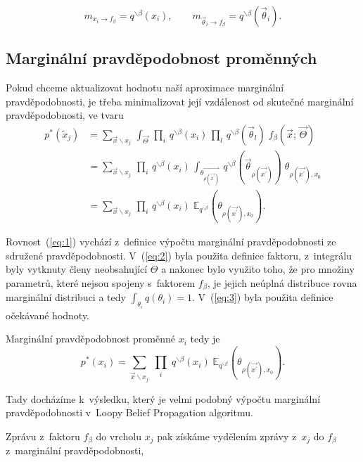 $$m_{x_i \rightarrow f_\beta} = q^{\backslash \beta}(x_i), 
\quad \quad
m_{\vec\theta_i \rightarrow f_\beta} = q^{\backslash \beta}(\vec\theta_i).$$

\subsection{Marginální pravděpodobnost proměnných}

Pokud chceme aktualizovat hodnotu naší aproximace marginální pravděpodobnosti,
je třeba minimalizovat její vzdálenost od skutečné marginální
pravděpodobnosti, ve tvaru
\begin{align}
p^*(\tilde{x}_j) &=
\sum_{\vec{x} \backslash x_j} \,
	\int_{\vec{\Theta}} \,
    		\prod_i \,
			q^{\backslash \beta}(x_i) \,
		\prod_l \,
			q^{\backslash \beta}(\vec{\theta}_l) \;
		f_\beta(\vec{x};\,
    		  \vec{\Theta})
\label{eq:1} 
\\
&=
\sum_{\vec{x} \backslash x_j} \,
	\prod_i \,
		q^{\backslash \beta}(x_i) \,
    \int_{\vec{\theta_{\rho(\vec{x^\prime})}}} \,
	    q^{\backslash \beta}(\vec{\theta}_{\rho(\vec{x^\prime})})\;
    \theta_{\rho(\vec{x^\prime}), x_0} \label{eq:2} 
\\
&= 
\sum_{\vec{x} \backslash x_j} \,
	\prod_i \,
		q^{\backslash \beta}(x_i)\;
    		\mathbb{E}_{q^{\backslash \beta}} 
			(\theta_{\rho(\vec{x^\prime}), x_0}).
\label{eq:3}
\end{align}

Rovnost~(\ref{eq:1}) vychází z~definice výpočtu marginální pravděpodobnosti ze
sdružené pravděpodobnosti.
V~(\ref{eq:2}) byla použita definice faktoru, z~integrálu byly vytknuty členy neobsahující $\Theta$ a nakonec bylo využito toho, že pro
množiny parametrů, které nejsou spojeny s~faktorem $f_\beta$, je jejich neúplná
distribuce rovna marginální distribuci a tedy $\int_{\theta_i} q(\theta_i) =
1$. V~(\ref{eq:3}) byla použita definice očekávané hodnoty.

Marginální pravděpodobnost proměnné $x_i$ tedy je
\begin{equation}
p^*(x_i) =
\sum_{\vec{x} \backslash x_j} \;
	\prod_i \;
		q^{\backslash \beta}(x_i)\;
    		\mathbb{E}_{q^{\backslash \beta}} 
			(\theta_{\rho(\vec{x^\prime}), x_0}).
\end{equation}

Tady docházíme k~výsledku, který je velmi podobný výpočtu marginální
pravděpodobnosti v~Loopy Belief Propagation algoritmu.

Zprávu z~faktoru $f_\beta$ do vrcholu $x_j$ pak získáme vydělením zprávy z~$x_j$ do $f_\beta$ z~marginální pravděpodobnosti,

